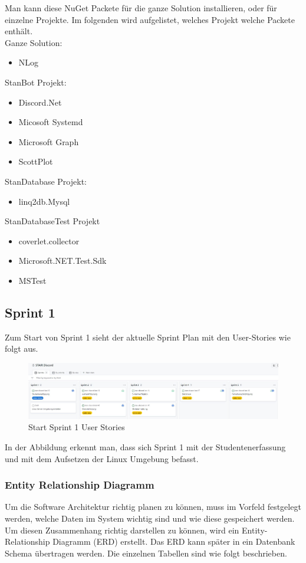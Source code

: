 \documentclass[a4paper, table]{article}
\begin{document}
Man kann diese NuGet Packete für die ganze Solution installieren, oder für einzelne Projekte.
Im folgenden wird aufgelistet, welches Projekt welche Packete enthält.\\
Ganze Solution:
\begin{itemize}
    \item NLog
\end{itemize}
StanBot Projekt:
\begin{itemize}
    \item Discord.Net
    \item Micosoft Systemd
    \item Microsoft Graph
    \item ScottPlot
\end{itemize}
StanDatabase Projekt:
\begin{itemize}
    \item linq2db.Mysql
\end{itemize}
StanDatabaseTest Projekt
\begin{itemize}
    \item coverlet.collector
    \item Microsoft.NET.Test.Sdk
    \item MSTest
\end{itemize}

\newpage
\subsection{Sprint 1}
Zum Start von Sprint 1 sieht der aktuelle Sprint Plan mit den User-Stories wie folgt aus.
\begin{figure}[h]
    \centering
    \hspace*{-2cm}
    \includegraphics[width=1.3\textwidth]{img/Start_Sprint1_Stories.jpg}
    \caption{Start Sprint 1 User Stories}
    \label{fig:start_sprint_one}
\end{figure}

In der Abbildung erkennt man, dass sich Sprint 1 mit der Studentenerfassung und
mit dem Aufsetzen der Linux Umgebung befasst.

\subsubsection{Entity Relationship Diagramm}\label{entity-relationship-diagramm}
Um die Software Architektur richtig planen zu können, muss im Vorfeld festgelegt werden,
welche Daten im System wichtig sind und wie diese gespeichert werden.
Um diesen Zusammenhang richtig darstellen zu können, wird ein Entity-Relationship Diagramm (ERD) erstellt.
Das ERD kann später in ein Datenbank Schema übertragen werden.
Die einzelnen Tabellen sind wie folgt beschrieben.
\end{document}
